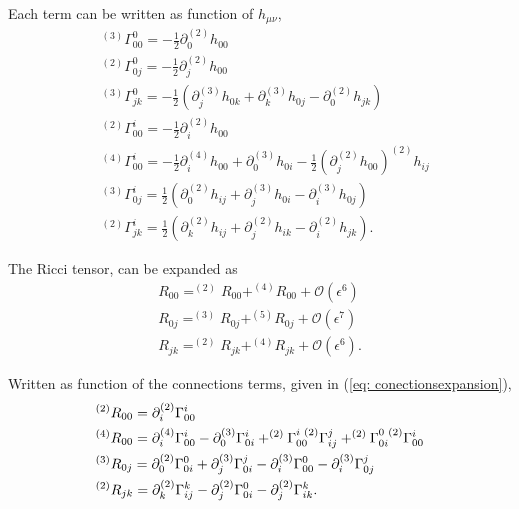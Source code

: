 Each term can be written as function of $h_{\mu\nu}$,
\begin{subequations}
\begin{align}
&^{(3)}\Gamma_{00}^0 =  -\frac{1}{2}\partial_0^{(2)}h_{00}\\
&^{(2)}\Gamma_{0j}^0 =-\frac{1}{2}\partial_j^{(2)}h_{00}\\
&^{(3)}\Gamma_{jk}^0 =-\frac{1}{2}(\partial_j^{(3)}h_{0k} +\partial_k^{(3)}h_{0j}-\partial_0^{(2)}h_{jk})\\
&^{(2)}\Gamma_{00}^i =-\frac{1}{2}\partial_i^{(2)}h_{00}\\
&^{(4)}\Gamma_{00}^i = -\frac{1}{2}\partial_i^{(4)}h_{00} +\partial_0^{(3)}h_{0i}-\frac{1}{2}( \partial_j^{(2)}h_{00}) ^{(2)}h_{ij}\\
&^{(3)}\Gamma_{0j}^i = \frac{1}{2}(\partial_0^{(2)}h_{ij} +\partial_j^{(3)}h_{0i}-\partial_i^{(3)}h_{0j})\\
&^{(2)}\Gamma_{jk}^i = \frac{1}{2}(\partial_k^{(2)}h_{ij} +\partial_j^{(2)}h_{ik}-\partial_i^{(2)}h_{jk}).
\end{align}
\end{subequations}


The Ricci tensor, can be expanded as
\begin{subequations}
\begin{align}
R_{00} = ^{(2)}R_{00}+^{(4)}R_{00}+\mathcal{O}(\epsilon^6)\\
R_{0j} = ^{(3)}R_{0j}+^{(5)}R_{0j}+\mathcal{O}(\epsilon^7)\\
R_{jk} = ^{(2)}R_{jk}+^{(4)}R_{jk}+\mathcal{O}(\epsilon^6).
\end{align}
\end{subequations}

Written as function of the connections terms, given in (\ref{eq: conectionsexpansion}),
\begin{subequations}
\begin{align}
&^{(2)}R_{00}=\partial_i^{(2)}\Gamma_{00}^{i}\\
&^{(4)}R_{00} = \partial_i^{(4)}\Gamma_{00}^{i}-\partial_0^{(3)}\Gamma_{0i}^{i} + ^{(2)}\Gamma_{00}^{i \hspace{0.1cm}(2)}\Gamma_{ij}^{j}+^{(2)}\Gamma_{0i}^{0\hspace{0.1cm}(2)}\Gamma_{00}^{i}\\
&^{(3)}R_{0j} =  \partial_0^{(2)}\Gamma_{0i}^{0}+\partial_j^{(3)}\Gamma_{0i}^{j} -\partial_i^{(3)}\Gamma_{00}^{0}-\partial_i^{(3)}\Gamma_{0j}^{j} \\
&^{(2)}R_{jk} =\partial_{k}^{(2)}\Gamma_{ij}^{k}-\partial_j^{(2)}\Gamma_{0i}^{0}-\partial_j^{(2)}\Gamma_{ik}^{k}.
\end{align}
\end{subequations}

